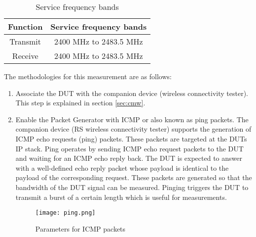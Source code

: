 \begin{table}[ht]
\begin{center}
\begin {tabular} {|c|c|} 
\toprule
Function & Service frequency bands \\ 
\midrule 
Transmit & 2400 MHz to 2483.5 MHz \\
Receive & 2400 MHz to 2483.5 MHz \\
\bottomrule
\end{tabular} 
\caption{Service frequency bands \cite{etsi300328}}
\label{tab:bands}
\end{center}
\end{table}
The methodologies for this measurement are as follows:
\begin{enumerate}
  \item Associate the \acs{DUT} with the companion device (wireless connectivity tester). This step is explained in section \ref{sec:cmw}.
   \item Enable the Packet Generator with \acf{ICMP} or also known as ping packets. The companion device (\acs{RS}\textregistered{} wireless connectivity tester) supports the generation of \acs{ICMP} echo requests (ping) packets. These packets are targeted at the \acsp{DUT} \acs{IP} stack. Ping operates by sending \acs{ICMP} echo request packets to the \acs{DUT} and waiting for an \acs{ICMP} echo reply back. The \acs{DUT} is expected to answer with a well-defined echo reply packet whose payload is identical to the payload of the corresponding request. These packets are generated so that the bandwidth of the \acs{DUT} signal can be measured. Pinging triggers the \acs{DUT} to transmit a burst of a certain length which is useful for measurements.

\begin{figure}[H]
\centering
\texttt{[image: ping.png]}
\caption{Parameters for \acs{ICMP} packets}
\label{fig:pingping}
\end{figure}



\end{enumerate}
